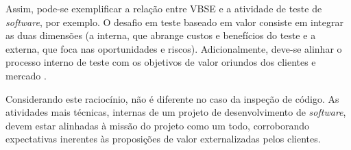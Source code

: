 Assim, pode-se exemplificar a relação entre VBSE e a atividade de teste de \textit{software}, por exemplo. O desafio em teste baseado em valor consiste em integrar as duas dimensões (a interna, que abrange custos e benefícios do teste e a externa, que foca nas oportunidades e riscos). Adicionalmente, deve-se  alinhar o processo interno de teste com os objetivos de valor oriundos dos clientes e mercado \cite{vbse1}.

Considerando este raciocínio, não é diferente no caso da inspeção de código. As atividades mais técnicas, internas de um projeto de desenvolvimento de \textit{software}, devem estar alinhadas à missão do projeto como um todo, corroborando expectativas inerentes às proposições de valor externalizadas pelos clientes.